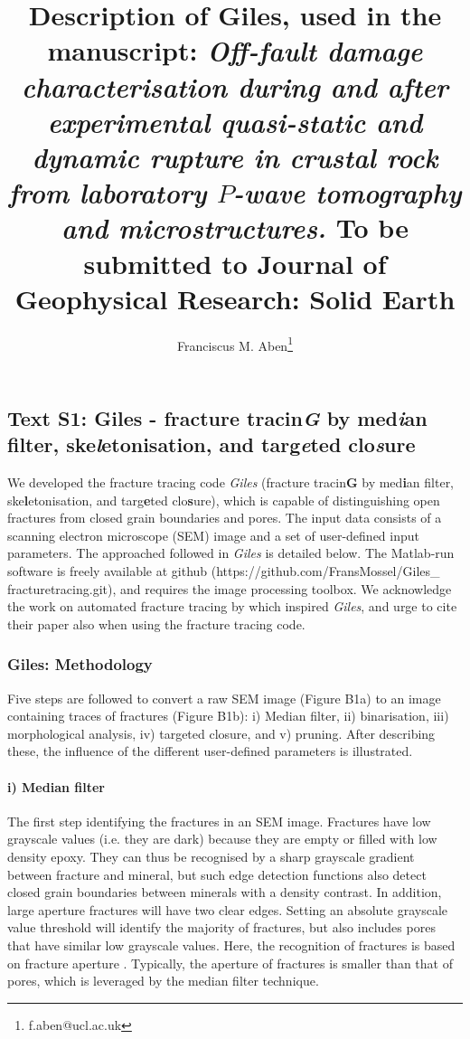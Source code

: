 \documentclass{article}
\title{Description of Giles, used in the manuscript: \textit{Off-fault damage characterisation during and after experimental quasi-static and dynamic rupture in crustal rock from laboratory $P$-wave tomography and microstructures.} To be submitted to Journal of Geophysical Research: Solid Earth}
\author{Franciscus M. Aben\thanks{f.aben@ucl.ac.uk}}
\date{}
\begin{document}
\maketitle
\begin{multicols}{2}

\section*{\textbf{Text S1}: Giles - fracture tracin\textit{G} by med\textit{i}an filter, ske\textit{l}etonisation, and targ\textit{e}ted clo\textit{s}ure }
We developed the fracture tracing code \textit{Giles} (fracture tracin\textbf{G} by med\textbf{i}an filter, ske\textbf{l}etonisation, and targ\textbf{e}ted clo\textbf{s}ure), which is capable of distinguishing open fractures from closed grain boundaries and pores. The input data consists of a scanning electron microscope (SEM) image and a set of user-defined input parameters. The approached followed in \textit{Giles} is detailed below. The Matlab-run software is freely available at github (https:\slash \slash github.com\slash FransMossel\slash  Giles\_ fracturetracing.git), and requires the image processing toolbox. We acknowledge the work on automated fracture tracing by \cite{Griffiths2017} which inspired \textit{Giles}, and urge to cite their paper also when using the fracture tracing code. 

\subsubsection*{Giles: Methodology}
Five steps are followed to convert a raw SEM image (Figure B1a) to an image containing traces of fractures (Figure B1b): i) Median filter, ii) binarisation, iii) morphological analysis, iv) targeted closure, and v) pruning. After describing these, the influence of the different user-defined parameters is illustrated.

\paragraph{i) Median filter}
The first step identifying the fractures in an SEM image. Fractures have low grayscale values (i.e. they are dark) because they are empty or filled with low density epoxy. They can thus be recognised by a sharp grayscale gradient between fracture and mineral, but such edge detection functions also detect closed grain boundaries between minerals with a density contrast. In addition, large aperture fractures will have two clear edges. Setting an absolute grayscale value threshold will identify the majority of fractures, but also includes pores that have similar low grayscale values. Here, the recognition of fractures is based on fracture aperture \cite[following][]{Griffiths2017}. Typically, the aperture of fractures is smaller than that of pores, which is leveraged by the median filter technique. 


\end{multicols}
\end{document}
